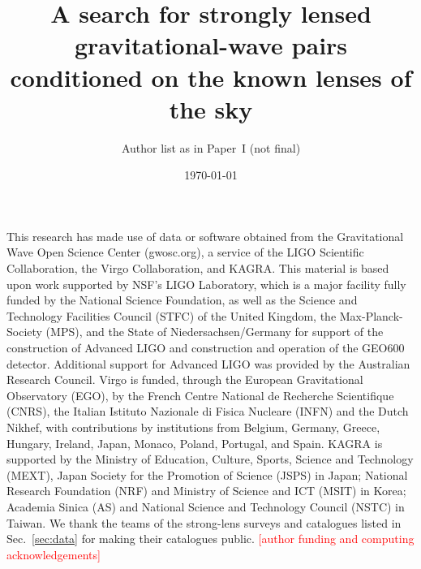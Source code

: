 \documentclass[aps,prl,twocolumn,superscriptaddress,nofootinbib,floatfix]{revtex4-2}
\newcommand{\TBD}[1]{\textcolor{red}{[#1]}}
\begin{document}
\title{A search for strongly lensed gravitational-wave pairs conditioned on the known lenses of the sky}
\author{Author list as in Paper~I (not final)}
\date{\today}

\maketitle

\begin{acknowledgments}
\begin{acknowledgments}
This research has made use of data or software obtained from the Gravitational Wave Open Science Center (gwosc.org), a service of the LIGO Scientific Collaboration, the Virgo Collaboration, and KAGRA. This material is based upon work supported by NSF's LIGO Laboratory, which is a major facility fully funded by the National Science Foundation, as well as the Science and Technology Facilities Council (STFC) of the United Kingdom, the Max-Planck-Society (MPS), and the State of Niedersachsen/Germany for support of the construction of Advanced LIGO and construction and operation of the GEO600 detector. Additional support for Advanced LIGO was provided by the Australian Research Council. Virgo is funded, through the European Gravitational Observatory (EGO), by the French Centre National de Recherche Scientifique (CNRS), the Italian Istituto Nazionale di Fisica Nucleare (INFN) and the Dutch Nikhef, with contributions by institutions from Belgium, Germany, Greece, Hungary, Ireland, Japan, Monaco, Poland, Portugal, and Spain. KAGRA is supported by the Ministry of Education, Culture, Sports, Science and Technology (MEXT), Japan Society for the Promotion of Science (JSPS) in Japan; National Research Foundation (NRF) and Ministry of Science and ICT (MSIT) in Korea; Academia Sinica (AS) and National Science and Technology Council (NSTC) in Taiwan. We thank the teams of the strong-lens surveys and catalogues listed in Sec.~\ref{sec:data} for making their catalogues public. \TBD{author funding and computing acknowledgements}
\end{acknowledgments}
\end{acknowledgments}

\end{document}
